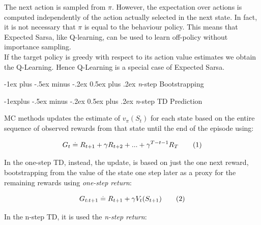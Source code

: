 \documentclass[10pt,landscape]{article}
\makeatletter
\renewcommand{\section}{\@startsection{section}{1}{0mm}%
                                {-1ex plus -.5ex minus -.2ex}%
                                {0.5ex plus .2ex}%
                                {\normalfont\large\bfseries}}
\renewcommand{\subsection}{\@startsection{subsection}{2}{0mm}%
                                {-1explus -.5ex minus -.2ex}%
                                {0.5ex plus .2ex}%
                                {\normalfont\normalsize\bfseries}}
\newcommand\numberthis{\addtocounter{equation}{1}\tag{\theequation}}
\makeatother
\begin{document}
\begin{multicols}{3}
The next action is sampled from $\pi$. However, the expectation over actions is computed independently of the action actually selected in the next state. 
In fact, it is not necessary that $\pi$ is equal to the behaviour policy. This means that Expected Sarsa, like Q-learning, can be used to learn off-policy without importance sampling. \\
If the target policy is greedy with respect to its action value estimates we obtain the Q-Learning. Hence Q-Learning is a special case of Expected Sarsa.

\section{\emph{n}-step Bootstrapping}

\subsection{\emph{n}-step TD Prediction}

MC methods updates the estimate of $v_{\pi}(S_t)$ for each state based on the entire sequence of observed rewards from that state until the end of the episode using: 

\begin{equation}
G_t \stackrel{.}{=} R_{t+1} + \gamma R_{t+2} + ... + \gamma^{T-t-1}R_T \numberthis
\end{equation}

In the one-step TD, instead, the update, is based on just the one next reward, bootstrapping from the value of the state one step later as a proxy for the remaining rewards using \emph{one-step return}: 

\begin{equation}
G_{t:t+1}\stackrel{.}{=} R_{t+1} + \gamma V_t(S_{t+1})  \numberthis
\end{equation}

In the n-step TD, it is used the \emph{n-step return}: 


\end{multicols}
\end{document}
